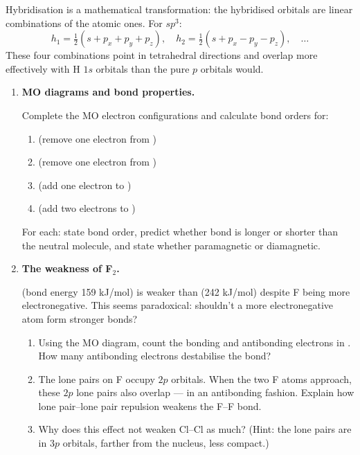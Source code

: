 \documentclass[12pt, a4paper]{book}
\begin{document}
Hybridisation is a mathematical transformation:
the hybridised orbitals are linear combinations of the
atomic ones.
For $sp^3$:
\[
  h_1 = \tfrac{1}{2}(s + p_x + p_y + p_z), \quad
  h_2 = \tfrac{1}{2}(s + p_x - p_y - p_z), \quad
  \ldots
\]
These four combinations point in tetrahedral directions
and overlap more effectively with H $1s$ orbitals
than the pure $p$ orbitals would.

\begin{problembox}
\begin{enumerate}[label=\textbf{\arabic*.}]
  \item \textbf{MO diagrams and bond properties.}

    Complete the MO electron configurations and calculate
    bond orders for:
    \begin{enumerate}[label=(\alph*)]
      \item {} (remove one electron from )
      \item {} (remove one electron from )
      \item {} (add one electron to )
      \item {} (add two electrons to )
    \end{enumerate}
    For each: state bond order, predict whether bond is
    longer or shorter than the neutral molecule, and state
    whether paramagnetic or diamagnetic.

  \item \textbf{The weakness of F$_2$.}

     (bond energy 159 kJ/mol) is weaker than
     (242 kJ/mol) despite F being more electronegative.
    This seems paradoxical: shouldn't a more electronegative
    atom form stronger bonds?

    \begin{enumerate}[label=(\alph*)]
      \item Using the MO diagram, count the bonding and
            antibonding electrons in .
            How many antibonding electrons destabilise the bond?
      \item The lone pairs on F occupy $2p$ orbitals.
            When the two F atoms approach, these $2p$ lone
            pairs also overlap --- in an antibonding fashion.
            Explain how lone pair--lone pair repulsion
            weakens the F--F bond.
      \item Why does this effect not weaken Cl--Cl as much?
            (Hint: the lone pairs are in $3p$ orbitals,
            farther from the nucleus, less compact.)
    \end{enumerate}


\end{enumerate}
\end{problembox}
\end{document}
